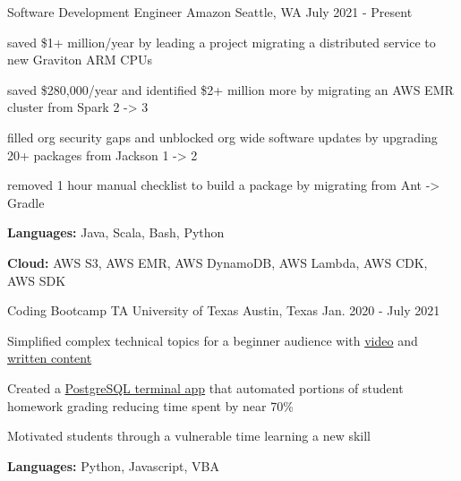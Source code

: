 

\begin{cventries}

  \cventry
    {Software Development Engineer} %
    {Amazon} %
    {Seattle, WA} %
    {July 2021 - Present} %
    {
      \begin{cvitems} %
        \item {saved \$1+ million/year by leading a project migrating a distributed service to new Graviton ARM CPUs}
        \item {saved \$280,000/year and identified \$2+ million more by migrating an AWS EMR cluster from Spark 2 -> 3}
        \item {filled org security gaps and unblocked org wide software updates by upgrading 20+ packages from Jackson 1 -> 2}
        \item {removed 1 hour manual checklist to build a package by migrating from Ant -> Gradle}
        \item {\textbf{Languages:} Java, Scala, Bash, Python}
        \item {\textbf{Cloud:} AWS S3, AWS EMR, AWS DynamoDB, AWS Lambda, AWS CDK, AWS SDK}
      \end{cvitems}
    }

  \cventry
    {Coding Bootcamp TA} %
    {University of Texas} %
    {Austin, Texas} %
    {Jan. 2020 - July 2021} %
    {
      \begin{cvitems} %
        \item {Simplified complex technical topics for a beginner audience with \href{https://youtu.be/G4tDjGUD-T4}{video} and \href{https://www.linkedin.com/pulse/how-deal-knowledge-work-frustration-geoff-langenderfer/?trackingId=Z6YGiHpVRFi4PCNxybaPfw\%3D\%3D}{written content}}
        \item {Created a \href{https://youtu.be/ELCZ5dAS6Zg}{PostgreSQL terminal app} that automated portions of student homework grading reducing time spent by near 70\%}
        \item {Motivated students through a vulnerable time learning a new skill}
        \item {\textbf{Languages:} Python, Javascript, VBA}
      \end{cvitems}
    }

\end{cventries}
